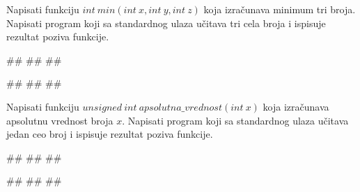\begin{Exercise}[label=p1.4_01] 
Napisati funkciju $int\ min(int\ x, int\ y, int\ z)$ koja izračunava minimum tri broja. Napisati program koji sa standardnog ulaza učitava tri cela broja i ispisuje rezultat poziva funkcije. \\
\begin{miditest}
\begin{upotreba}{1}
#\naslovInt#
##
##
\end{upotreba}
\end{miditest}
\begin{miditest}
\begin{upotreba}{2}
#\naslovInt#
##
##
\end{upotreba}
\end{miditest}
\end{Exercise}
\begin{Answer}[ref=p1.4_01]
\end{Answer}

\begin{Exercise}[label=p1.4_02] 
Napisati funkciju $unsigned\ int\ apsolutna\_vrednost(int\ x)$ koja izračunava apsolutnu vrednost broja $x$. Napisati program koji sa standardnog ulaza učitava jedan ceo broj i ispisuje rezultat poziva funkcije.  \\
\begin{miditest}
\begin{upotreba}{1}
#\naslovInt#
##
##
\end{upotreba}
\end{miditest}
\begin{miditest}
\begin{upotreba}{2}
#\naslovInt#
##
##
\end{upotreba}
\end{miditest}

\end{Exercise}
\begin{Answer}[ref=p1.4_02]
\end{Answer}


